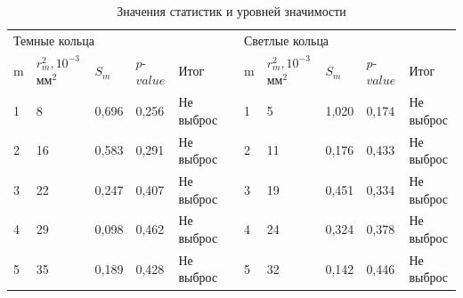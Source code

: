 \documentclass[a4paper,12pt]{article}
\theoremstyle{plain} %
\theoremstyle{definition} %
\theoremstyle{remark} %
\begin{document}
\begin{table}[h!]
	\centering
	\caption{Значения статистик и уровней значимости}
	\label{pvalue}
	\begin{tabular}{lllllllllll}
		\multicolumn{5}{l}{Темные кольца} &  & \multicolumn{5}{l}{Светлые кольца} \\ \cline{1-5} \cline{7-11} 
		\multicolumn{1}{|l|}{m} & \multicolumn{1}{l|}{$r^2_m, 10^{-3}$ мм$^2$} & \multicolumn{1}{l|}{$S_m$} & \multicolumn{1}{l|}{$p$-$value$} & \multicolumn{1}{l|}{Итог} & \multicolumn{1}{l|}{} & \multicolumn{1}{l|}{m} & \multicolumn{1}{l|}{$r^2_m, 10^{-3}$ мм$^2$} & \multicolumn{1}{l|}{$S_m$} & \multicolumn{1}{l|}{$p$-$value$} & \multicolumn{1}{l|}{Итог} \\ \cline{1-5} \cline{7-11} 
		\multicolumn{1}{|l|}{1} & \multicolumn{1}{l|}{8} & \multicolumn{1}{l|}{0,696} & \multicolumn{1}{l|}{0,256} & \multicolumn{1}{l|}{Не выброс} & \multicolumn{1}{l|}{} & \multicolumn{1}{l|}{1} & \multicolumn{1}{l|}{5} & \multicolumn{1}{l|}{1,020} & \multicolumn{1}{l|}{0,174} & \multicolumn{1}{l|}{Не выброс} \\ \cline{1-5} \cline{7-11} 
		\multicolumn{1}{|l|}{2} & \multicolumn{1}{l|}{16} & \multicolumn{1}{l|}{0,583} & \multicolumn{1}{l|}{0,291} & \multicolumn{1}{l|}{Не выброс} & \multicolumn{1}{l|}{} & \multicolumn{1}{l|}{2} & \multicolumn{1}{l|}{11} & \multicolumn{1}{l|}{0,176} & \multicolumn{1}{l|}{0,433} & \multicolumn{1}{l|}{Не выброс} \\ \cline{1-5} \cline{7-11} 
		\multicolumn{1}{|l|}{3} & \multicolumn{1}{l|}{22} & \multicolumn{1}{l|}{0,247} & \multicolumn{1}{l|}{0,407} & \multicolumn{1}{l|}{Не выброс} & \multicolumn{1}{l|}{} & \multicolumn{1}{l|}{3} & \multicolumn{1}{l|}{19} & \multicolumn{1}{l|}{0,451} & \multicolumn{1}{l|}{0,334} & \multicolumn{1}{l|}{Не выброс} \\ \cline{1-5} \cline{7-11} 
		\multicolumn{1}{|l|}{4} & \multicolumn{1}{l|}{29} & \multicolumn{1}{l|}{0,098} & \multicolumn{1}{l|}{0,462} & \multicolumn{1}{l|}{Не выброс} & \multicolumn{1}{l|}{} & \multicolumn{1}{l|}{4} & \multicolumn{1}{l|}{24} & \multicolumn{1}{l|}{0,324} & \multicolumn{1}{l|}{0,378} & \multicolumn{1}{l|}{Не выброс} \\ \cline{1-5} \cline{7-11} 
		\multicolumn{1}{|l|}{5} & \multicolumn{1}{l|}{35} & \multicolumn{1}{l|}{0,189} & \multicolumn{1}{l|}{0,428} & \multicolumn{1}{l|}{Не выброс} & \multicolumn{1}{l|}{} & \multicolumn{1}{l|}{5} & \multicolumn{1}{l|}{32} & \multicolumn{1}{l|}{0,142} & \multicolumn{1}{l|}{0,446} & \multicolumn{1}{l|}{Не выброс} \\ \cline{1-5} \cline{7-11} 

\end{tabular}
\end{table}
\end{document}
